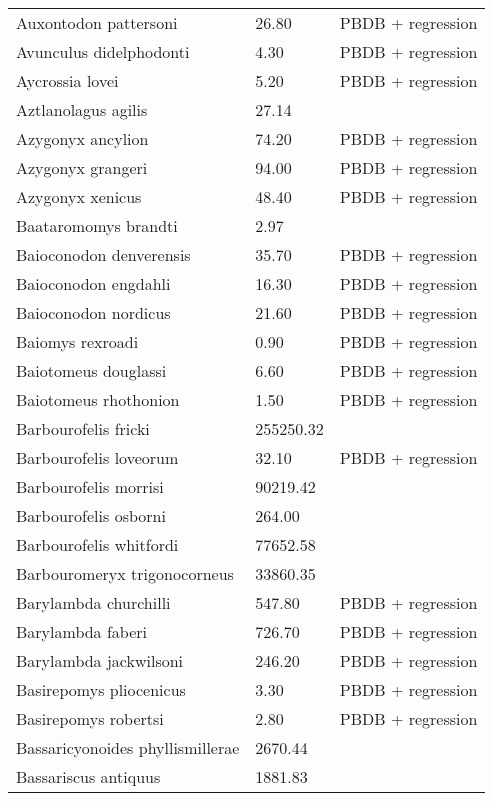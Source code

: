 \begin{longtable}{p{} p{} p{}}
    Auxontodon pattersoni & 26.80 & PBDB + regression \\ 
    Avunculus didelphodonti & 4.30 & PBDB + regression \\ 
    Aycrossia lovei & 5.20 & PBDB + regression \\ 
    Aztlanolagus agilis & 27.14 & \cite{Smith2004} \\ 
    Azygonyx ancylion & 74.20 & PBDB + regression \\ 
    Azygonyx grangeri & 94.00 & PBDB + regression \\ 
    Azygonyx xenicus & 48.40 & PBDB + regression \\ 
    Baataromomys brandti & 2.97 & \cite{Silcox2008} \\ 
    Baioconodon denverensis & 35.70 & PBDB + regression \\ 
    Baioconodon engdahli & 16.30 & PBDB + regression \\ 
    Baioconodon nordicus & 21.60 & PBDB + regression \\ 
    Baiomys rexroadi & 0.90 & PBDB + regression \\ 
    Baiotomeus douglassi & 6.60 & PBDB + regression \\ 
    Baiotomeus rhothonion & 1.50 & PBDB + regression \\ 
    Barbourofelis fricki & 255250.32 & \cite{Tomiya2013} \\ 
    Barbourofelis loveorum & 32.10 & PBDB + regression \\ 
    Barbourofelis morrisi & 90219.42 & \cite{Tomiya2013} \\ 
    Barbourofelis osborni & 264.00 & \cite{Martin2002a} \\ 
    Barbourofelis whitfordi & 77652.58 & \cite{Tomiya2013} \\ 
    Barbouromeryx trigonocorneus & 33860.35 & \cite{Tomiya2013} \\ 
    Barylambda churchilli & 547.80 & PBDB + regression \\ 
    Barylambda faberi & 726.70 & PBDB + regression \\ 
    Barylambda jackwilsoni & 246.20 & PBDB + regression \\ 
    Basirepomys pliocenicus & 3.30 & PBDB + regression \\ 
    Basirepomys robertsi & 2.80 & PBDB + regression \\ 
    Bassaricyonoides phyllismillerae & 2670.44 & \cite{Tomiya2013} \\ 
    Bassariscus antiquus & 1881.83 & \cite{Tomiya2013} \\ 

\end{longtable}

